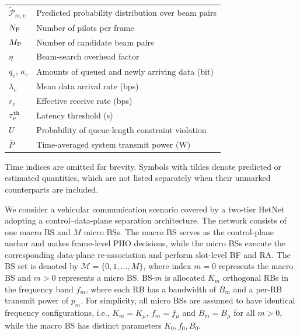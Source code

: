 \documentclass[10pt,journal,letterpaper]{IEEEtran}
\newcommand{\rev}[1]{\textcolor{revisioncolor}{{}#1}}
\theoremstyle{remark}
\begin{document}
\begin{table}[t]
\begin{tabular}{@{}>{\raggedright\arraybackslash}p{}>{\raggedright\arraybackslash}p{}@{}}
        $\tilde{\mathcal P}_{m,v}$ & Predicted probability distribution over beam pairs \\
        $N_{\rm P}$ & Number of pilots per frame\\
        $M_{\rm P}$ & Number of candidate beam pairs \\
        $\eta$ & Beam-search overhead factor\\
        $q_v,\,a_v$ & Amounts of queued and newly arriving data (bit) \\
        $\lambda_v$ & Mean data arrival rate (bps)\\
        $r_v$ & Effective receive rate (bps) \\
        \rev{$\tau_v^{\rm th}$} & Latency threshold (s)\\
        $U$ & Probability of queue-length constraint violation\\
        $\bar{P}$ & Time-averaged system transmit power (W) \\
        \bottomrule
    \end{tabular}
    \par\smallskip
    \parbox{\columnwidth}{\footnotesize Time indices are omitted for brevity. Symbols with tildes denote predicted or estimated quantities, which are not listed separately when their unmarked counterparts are included.}
\end{table}

We consider a vehicular communication scenario covered by a two-tier HetNet adopting a {control–data-plane separation} architecture. 
The network consists of one macro BS and $M$ micro BSs. The macro BS serves as the control-plane anchor and makes {frame-level} PHO decisions, while the micro BSs execute the corresponding {data-plane} re-association and perform {slot-level} BF and RA.
The BS set is denoted by $\mathcal{M} = \{0, 1, \dots, M\}$, where index $m=0$ represents the macro BS and $m>0$ represents a micro BS. BS-$m$ is allocated $K_m$ orthogonal RBs in the frequency band $f_m$, where each RB has a bandwidth of $B_m$ and a per-RB transmit power of $p_m$. 
For simplicity, all micro BSs are assumed to have identical frequency configurations, i.e., $K_m = K_\mu$, $f_m = f_\mu$ and $B_m = B_\mu$ for all $m>0$, while the macro BS has distinct parameters ${K_0, f_0, B_0}$.
\end{document}
